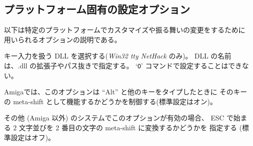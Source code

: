 \subsection*{プラットフォーム固有の設定オプション}

以下は特定のプラットフォームでカスタマイズや振る舞いの変更をするために
用いられるオプションの説明である。

\blist{}
\item[\ib{altkeyhandler}]
キー入力を扱う DLL を選択する({\it Win32 tty\/ NetHack\/} のみ)。
DLL の名前は、.dll の拡張子やパス抜きで指定する。
`{\tt O}' コマンドで設定することはできない。
\item[\ib{altmeta}]
Amigaでは、このオプションは ``Alt'' と他のキーをタイプしたときに
そのキーの meta-shift として機能するかどうかを制御する(標準設定はオン)。
\item[\ib{altmeta}]
その他 (Amiga 以外) のシステムでこのオプションが有効の場合、
ESC で始まる 2 文字並びを 2 番目の文字の meta-shift に変換するかどうかを
指定する (標準設定はオフ)。

